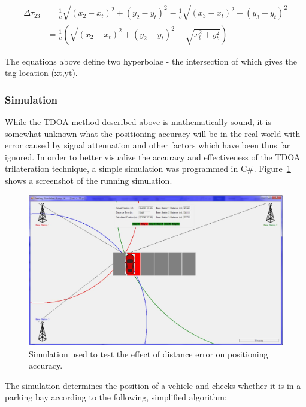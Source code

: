 \begin{equation*}
\begin{split}
\Delta \tau_{23} &= \frac{1}{c} \sqrt{(x_2-x_t)^2 + (y_2-y_t)^2} - \frac{1}{c} \sqrt{(x_3-x_t)^2 + (y_3-y_t)^2}\\ 
&= \frac{1}{c} (\sqrt{(x_2-x_t)^2 + (y_2-y_t)^2} - \sqrt{x_t^2 + y_t^2})
\end{split}
\end{equation*}

The equations above define two hyperbolae - the intersection of which gives the tag location (xt,yt).\cite{gaffney}

\newpage
\subsubsection{Simulation}

While the TDOA method described above is mathematically sound, it is somewhat unknown what the positioning accuracy will be in the real world with error caused by signal attenuation and other factors which have been thus far ignored. In order to better visualize the accuracy and effectiveness of the TDOA trilateration technique, a simple simulation was programmed in C\#. Figure~\ref{fig:distance-error} shows a screenshot of the running simulation.

\begin{figure}[H]
\begin{center}
\includegraphics[scale=0.4]{data/software/3.jpg}
\caption{Simulation used to test the effect of distance error on positioning accuracy.}
\label{fig:distance-error}
\end{center}
\end{figure}

The simulation determines the position of a vehicle and checks whether it is in a parking bay according to the following, simplified algorithm:

